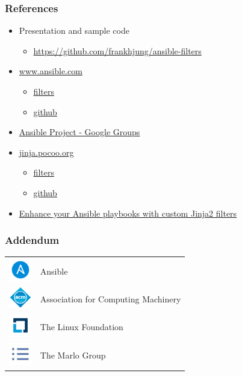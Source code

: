 \documentclass[pdf]{beamer}
\begin{document}
\begin{frame}
  \frametitle{References}
  \begin{itemize}
    \item
      Presentation and sample code
      \begin{itemize}
        \item \url{https://github.com/frankhjung/ansible-filters}
      \end{itemize}
    \item
      \href{https://www.ansible.com/}{www.ansible.com}
      \begin{itemize}
        \item \href{http://docs.ansible.com/ansible/playbooks_filters.html}{filters}
        \item \href{https://github.com/ansible/ansible}{github}
      \end{itemize}
    \item
      \href{https://groups.google.com/d/forum/ansible-project}{Ansible Project - Google Groups}
    \item
      \href{http://jinja.pocoo.org/}{jinja.pocoo.org}
      \begin{itemize}
        \item \href{http://jinja.pocoo.org/docs/2.9/templates}{filters}
        \item \href{https://github.com/pallets/jinja}{github}
      \end{itemize}
    \item
      \href{https://opensolitude.com/2016/05/21/ansible-jinja2-filter-plugins.html}{Enhance your Ansible playbooks with custom Jinja2 filters}
  \end{itemize}
\end{frame}

\begin{frame}
  \frametitle{Addendum}
  \begin{tabular}{ m{1cm} m{6cm} }
    \includegraphics[width=1.0cm]{ansible-logo.png} & Ansible \\
    \includegraphics[width=1.0cm]{acm-logo.png} & Association for Computing Machinery \\
    \includegraphics[width=1.0cm]{thelinuxfoundation-logo.png} & The Linux Foundation \\
    \includegraphics[width=1.0cm]{themarlogroup-logo.png} & The Marlo Group
  \end{tabular}
\end{frame}
\end{document}
